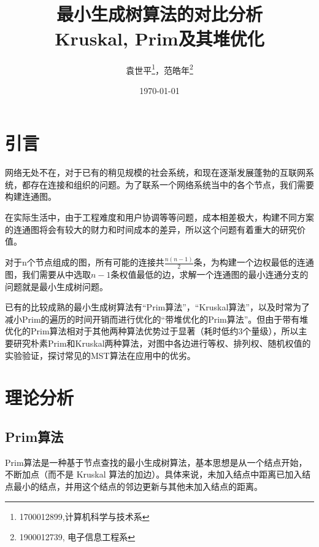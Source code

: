 \documentclass[UTF8]{ctexart}
\title{\heiti {科技交流与写作课程论文} \\ \Huge 最小生成树算法的对比分析\\ \huge Kruskal, Prim及其堆优化}
\author{\kaishu 袁世平\footnote{1700012899,计算机科学与技术系}，范皓年\footnote{1900012739, 电子信息工程系}}
\date{\today}
\begin{document}
\maketitle

\tableofcontents
\newpage
\section{引言}
网络无处不在，对于已有的稍见规模的社会系统，和现在逐渐发展蓬勃的互联网系统，都存在连接和组织的问题。为了联系一个网络系统当中的各个节点，我们需要构建连通图。

在实际生活中，由于工程难度和用户协调等等问题，成本相差极大，构建不同方案的连通图将会有较大的财力和时间成本的差异，所以这个问题有着重大的研究价值。

对于n个节点组成的图，所有可能的连接共\(\frac{n(n-1)}{2}\)条，为构建一个边权最低的连通图，我们需要从中选取\(n-1\)条权值最低的边，求解一个连通图的最小连通分支的问题就是最小生成树问题。

已有的比较成熟的最小生成树算法有“Prim算法”，“Kruskal算法”\cite{RN4}，以及时常为了减小Prim的遍历的时间开销而进行优化的“带堆优化的Prim算法”。但由于带有堆优化的Prim算法相对于其他两种算法优势过于显著（耗时低约3个量级），所以主要研究朴素Prim和Kruskal两种算法，对图中各边进行等权、排列权、随机权值的实验验证，探讨常见的MST算法在应用中的优劣。


\section{理论分析}\label{sec:theo}
\subsection{Prim算法} 

Prim算法\cite{RN3}是一种基于节点查找的最小生成树算法，基本思想是从一个结点开始，不断加点（而不是 Kruskal 算法的加边）。具体来说，未加入结点中距离已加入结点最小的结点，并用这个结点的邻边更新与其他未加入结点的距离。
\end{document}
